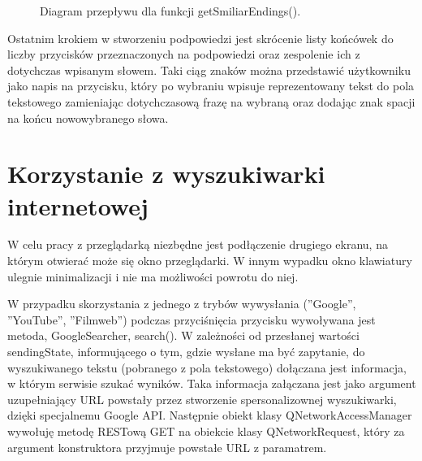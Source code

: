 \documentclass[twoside,a4paper]{book}
\begin{document}
				\begin{figure}[!h]
		\centering
		\caption{Diagram przepływu dla funkcji getSmiliarEndings().}
		\label{fig:similarEndingsFlow}
		\end{figure}
Ostatnim krokiem w stworzeniu podpowiedzi jest skrócenie listy końcówek do liczby przycisków przeznaczonych na podpowiedzi oraz zespolenie ich z dotychczas wpisanym słowem. Taki ciąg znaków można przedstawić użytkowniku jako napis na przycisku, który po wybraniu wpisuje reprezentowany tekst do pola tekstowego zamieniając dotychczasową frazę na wybraną oraz dodając znak spacji na końcu nowowybranego słowa.

\section{Korzystanie z wyszukiwarki internetowej}
W celu pracy z przeglądarką niezbędne jest podłączenie drugiego ekranu, na którym otwierać może się okno przeglądarki. W innym wypadku okno kla\-wia\-tu\-ry ulegnie minimalizacji i nie ma możliwości powrotu do niej.

W przypadku skorzystania z jednego z trybów wywysłania (''Google'', \\''YouTube'', ''Filmweb'') podczas przyciśnięcia przycisku wywoływana jest metoda, GoogleSearcher, search(). W zależności od przesłanej wartości sendingState, informującego o tym, gdzie wysłane ma być zapytanie, do wyszukiwanego tekstu (pobranego z pola tekstowego) dołączana jest informacja, w którym serwisie szukać wyników. Taka informacja załączana jest jako argument uzupełniający URL powstały przez stworzenie spersonalizownej wyszukiwarki, dzięki spe\-cja\-lne\-mu Google API. Następnie obiekt klasy QNetworkAccessManager wywołuję metodę RESTową GET na obiekcie klasy QNetworkRequest, który za argument konstruktora przyjmuje powstałe URL z paramatrem.
\end{document}

